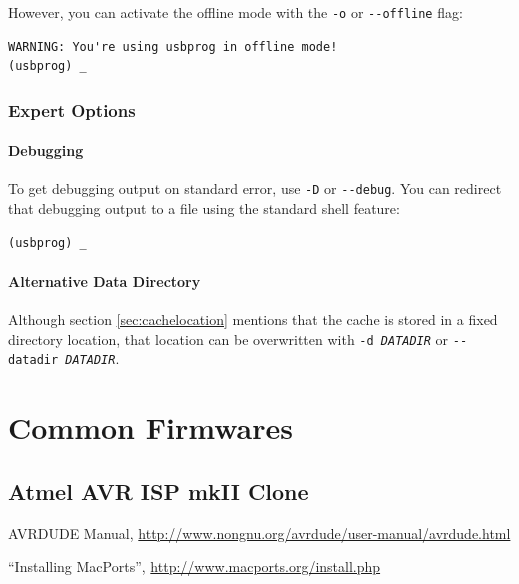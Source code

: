 \documentclass[bibtotoc,UKenglish,halfparskip,oneside,DIV12]{scrreprt}
\begin{document}
However, you can activate the offline mode with the \texttt{-o} or \texttt{-{-}offline} flag:

\begin{lstlisting}[style=inline]
% usbprog -o
WARNING: You're using usbprog in offline mode!
(usbprog) _
\end{lstlisting}

\subsection{Expert Options}

\subsubsection{Debugging}

To get debugging output on standard error, use \texttt{-D} or \texttt{-{-}debug}. You can redirect
that debugging output to a file using the standard shell feature:

\begin{lstlisting}[style=inline]
% usbprog --debug 2> debug.log
(usbprog) _
\end{lstlisting}

\subsubsection{Alternative Data Directory}

Although section \vref{sec:cachelocation} mentions that the cache is stored in a fixed directory
location, that location can be overwritten with \texttt{-d \emph{DATADIR}} or \texttt{-{-}datadir
\emph{DATADIR}}.


\chapter{Common Firmwares}
\label{sec:commonfirmwares}

\section{Atmel AVR ISP mkII Clone}

\begin{thebibliography}{99}
   AVRDUDE Manual,
    \url{http://www.nongnu.org/avrdude/user-manual/avrdude.html}

   ``Installing MacPorts'', \url{http://www.macports.org/install.php}
\end{thebibliography}
\end{document}
